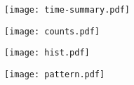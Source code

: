 \documentclass[11pt,letterpaper,twocolumn]{article}
\begin{document}
\selectfont

\pagestyle{fancy}

\begin{figure}[!h]
\centering

\end{figure}

\begin{figure}[!h]
\centering
\texttt{[image: time-summary.pdf]}
\end{figure}

\begin{figure}[!h]
\centering
\texttt{[image: counts.pdf]}
\end{figure}

\begin{figure}[!h]
\centering
\texttt{[image: hist.pdf]}
\end{figure}

\begin{figure}[!h]
\centering
\texttt{[image: pattern.pdf]}
\end{figure}

\begin{figure}[!h]
\centering

\end{figure}


%
%
\end{document}
